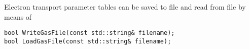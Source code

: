  
Electron transport parameter tables can be saved to file 
and read from file by means of
\begin{lstlisting}
bool WriteGasFile(const std::string& filename);
bool LoadGasFile(const std::string& filename);
\end{lstlisting}

